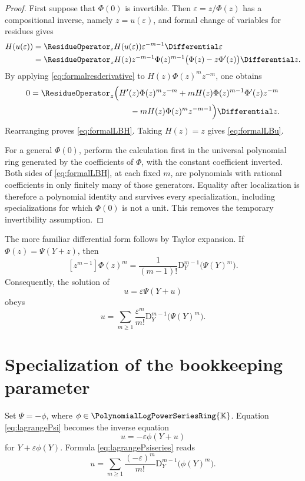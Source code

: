 \documentclass[11pt,oneside,openany]{book}
\newcommand{\K}{\mathbb{K}}
\newcommand{\Rring}{\PolynomialLogPowerSeriesRing{\K}}
\newcommand{\D}{\mathrm{D}}
\newcommand{\eps}{\varepsilon}
\begin{document}
\begin{proof}
First suppose that \(\Phi(0)\) is invertible.  Then
\(\eps=z/\Phi(z)\) has a compositional inverse, namely \(z=u(\eps)\), and
formal change of variables for residues gives
\begin{align*}
 [\eps^m]H(u(\eps))
 &=\ResidueOperator_\eps H(u(\eps))\eps^{-m-1}\Differential\eps\\
 &=\ResidueOperator_z H(z)z^{-m-1}\Phi(z)^{m-1}
       \bigl(\Phi(z)-z\Phi'(z)\bigr)\Differential z.
\end{align*}
By applying \cref{eq:formalresderivative} to
\(H(z)\Phi(z)^mz^{-m}\), one obtains
\begin{align*}
 0={}&\ResidueOperator_z\Bigl(
 H'(z)\Phi(z)^mz^{-m}
 +mH(z)\Phi(z)^{m-1}\Phi'(z)z^{-m}\\
 &\hspace{38mm}
 -mH(z)\Phi(z)^mz^{-m-1}
 \Bigr)\Differential z.
\end{align*}
Rearranging proves \cref{eq:formalLBH}.  Taking \(H(z)=z\) gives
\cref{eq:formalLBu}.

For a general \(\Phi(0)\), perform the calculation first in the universal
polynomial ring generated by the coefficients of \(\Phi\), with the constant
coefficient inverted.  Both sides of \cref{eq:formalLBH}, at each fixed
\(m\), are polynomials with rational coefficients in only finitely many of
those generators.  Equality after localization is therefore a polynomial
identity and survives every specialization, including specializations for
which \(\Phi(0)\) is not a unit.  This removes the temporary invertibility
assumption.
\end{proof}

The more familiar differential form follows by Taylor expansion.  If
\(\Phi(z)=\Psi(Y+z)\), then
\[
 [z^{m-1}]\Phi(z)^m
 =\frac{1}{(m-1)!}\D_Y^{m-1}\bigl(\Psi(Y)^m\bigr).
\]
Consequently, the solution of
\begin{equation}\label{eq:lagrangePsi}
 u=\eps\Psi(Y+u)
\end{equation}
obeys
\begin{equation}\label{eq:lagrangePsiseries}
 u=\sum_{m\geq1}\frac{\eps^m}{m!}
 \D_Y^{m-1}\bigl(\Psi(Y)^m\bigr).
\end{equation}

\section{Specialization of the bookkeeping parameter}
Set \(\Psi=-\phi\), where \(\phi\in\Rring\).  Equation
\cref{eq:lagrangePsi} becomes the inverse equation
\[
 u=-\eps\phi(Y+u)
\]
for \(Y+\eps\phi(Y)\).  Formula \cref{eq:lagrangePsiseries} reads
\begin{equation}\label{eq:lagrangeepsappendix}
 u=\sum_{m\geq1}\frac{(-\eps)^m}{m!}
 \D_Y^{m-1}\bigl(\phi(Y)^m\bigr).
\end{equation}
\end{document}
